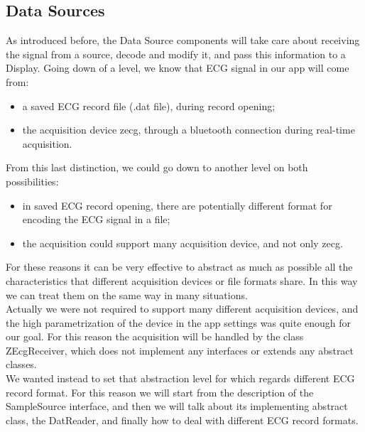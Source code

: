 \subsection{Data Sources}
As introduced before, the Data Source components will take care about receiving the signal from a source, decode and modify it, and pass this information to a Display. Going down of a level, we know that ECG signal in our app will come from:
\begin{itemize}
	\item a saved ECG record file (.dat file), during record opening;
	\item the acquisition device zecg, through a bluetooth connection during real-time acquisition.
\end{itemize}
From this last distinction, we could go down to another level on both possibilities:
\begin{itemize}
	\item in saved ECG record opening, there are potentially different format for encoding the ECG signal in a file;
	\item the acquisition could support many acquisition device, and not only zecg.
\end{itemize}
For these reasons it can be very effective to abstract as much as possible all the characteristics that different acquisition devices or file formats share. In this way we can treat them on the same way in many situations.\\
Actually we were not required to support many different acquisition devices, and the high parametrization of the device in the app settings was quite enough for our goal. For this reason the acquisition will be handled by the class ZEcgReceiver, which does not implement any interfaces or extends any abstract classes.\\
We wanted instead to set that abstraction level for which regards different ECG record format. For this reason we will start from the description of the SampleSource interface, and then we will talk about its implementing abstract class, the DatReader, and finally how to deal with different ECG record formats.

